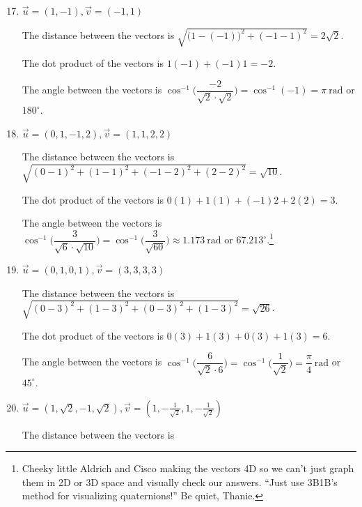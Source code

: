 \documentclass{article}
\begin{document}
\begin{enumerate}
    \setcounter{enumi}{16}
    \item \(\overrightarrow{u} = (1,-1), \overrightarrow{v} = (-1,1)\)\begin{solution}
        The distance between the vectors is \(\sqrt{{\bigl(1-(-1)\bigr)}^2 + {(-1 -1)}^2} = 2\sqrt{2}\).\par
        The dot product of the vectors is \(1(-1) + (-1)1 = -2\).\par 
        The angle between the vectors is \(\cos^{-1} \biggl(\dfrac{-2}{\sqrt{2}\cdot\sqrt{2}}\biggr) = \cos^{-1} (-1) = \pi~\text{rad}\) or \(180^{\circ}\). 
    \end{solution}
    \item \(\overrightarrow{u} = (0,1,-1,2), \overrightarrow{v} = (1,1,2,2)\)\begin{solution}
        The distance between the vectors is \(\sqrt{{(0-1)}^2 + {(1 -1)}^2 + {(-1 -2)}^2 + {(2 -2)}^2} = \sqrt{10}\).\par
        The dot product of the vectors is \(0(1) + 1(1) + (-1)2 + 2(2) = 3\).\par 
        The angle between the vectors is \(\cos^{-1} \biggl(\dfrac{3}{\sqrt{6}\cdot\sqrt{10}}\biggr) = \cos^{-1} \biggl(\dfrac{3}{\sqrt{60}}\biggr) \approx 1.173~\text{rad}\) or \(67.213^{\circ}\).\footnote{Cheeky little Aldrich and Cisco making the vectors 4D so we can't
        just graph them in 2D or 3D space and visually check our answers. ``Just use 3B1B's method for visualizing quaternions!'' Be quiet, Thanie.} 
    \end{solution}
    \item \(\overrightarrow{u} = (0,1,0,1), \overrightarrow{v} = (3,3,3,3)\)\begin{solution}
        The distance between the vectors is \(\sqrt{{(0-3)}^2 + {(1 -3)}^2 + {(0 -3)}^2 + {(1 -3)}^2} = \sqrt{26}\).\par
        The dot product of the vectors is \(0(3) + 1(3) + 0(3) + 1(3) = 6\).\par 
        The angle between the vectors is \(\cos^{-1} \biggl(\dfrac{6}{\sqrt{2}\cdot6}\biggr) = \cos^{-1} \biggl(\dfrac{1}{\sqrt{2}}\biggr) = \dfrac{\pi}{4}~\text{rad}\) or \(45^{\circ}\).
    \end{solution}
    \item \(\overrightarrow{u} = (1,\sqrt{2},-1,\sqrt{2}), \overrightarrow{v} = (1,-\frac{1}{\sqrt{2}},1,-\frac{1}{\sqrt{2}})\)\begin{solution}
        The distance between the vectors is\[
\]
\end{solution}
\end{enumerate}
\end{document}
